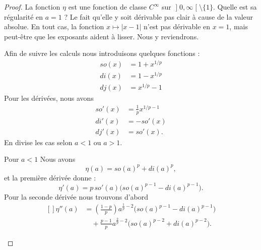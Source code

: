 \begin{proof}
    La fonction \( \eta\) est une fonction de classe \(  C^{\infty}\) sur \( \mathopen] 0 , \infty \mathclose[\setminus\{ 1 \}\). Quelle est sa régularité en \( a=1\) ? Le fait qu'elle y soit dérivable pas clair à cause de la valeur absolue. En tout cas, la fonction \( x\mapsto| x-1 |\) n'est pas dérivable en \( x=1\), mais peut-être que les exposants aident à lisser. Nous y reviendrons.

    Afin de  suivre les calculs nous introduisons quelques fonctions :
    \begin{subequations}
        \begin{align}
            so(x)&=1+x^{1/p}\\
            di(x)&=1-x^{1/p}\\
            dj(x)&=x^{1/p}-1
        \end{align}
    \end{subequations}
    Pour les dérivées, nous avons
    \begin{subequations}
        \begin{align}
            so'(x)&=\frac{1}{ p }x^{1/p-1}\\
            di'(x)&=-so'(x)\\
            dj'(x)&=so'(x).
        \end{align}
    \end{subequations}
    En divise les cas selon \( a<1\) ou \( a>1\).
    \begin{subproof}
    \item[Pour \( a<1\)]
        Nous avons
        \begin{equation}
            \eta(a)=so(a)^p+di(a)^p,
        \end{equation}
        et la première dérivée donne :
        \begin{equation}        \label{EQooCLXZooXClOwd}
            \eta'(a)=p\,so'(a)\big( so(a)^{p-1}-di(a)^{p-1} \big).
        \end{equation}
        Pour la seconde dérivée nous trouvons d'abord
        \begin{equation}
            \begin{aligned}[]
            \eta''(a)&=\left( \frac{ 1-p }{ p } \right)a^{\frac{ 1 }{ p }-2}\big( so(a)^{p-1}-di(a)^{p-1} \big)\\
            &\quad+\frac{ p-1 }{ p }a^{\frac{ 2 }{ p }-2}\big( so(a)^{p-2}+di(a)^{p-2} \big).
            \end{aligned}
        \end{equation}

\end{subproof}
\end{proof}
